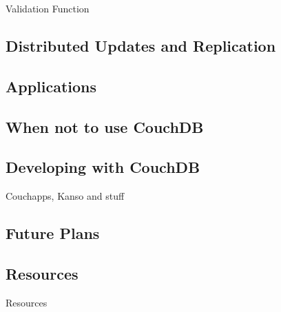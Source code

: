 \documentclass{beamer}
\begin{document}
\begin{frame}{Validation Function}
\end{frame}

\subsection{Distributed Updates and Replication}
\begin{frame}
\end{frame}

\subsection{Applications}
\begin{frame}
\end{frame}

\subsection{When not to use CouchDB}
\begin{frame}
\end{frame}

\subsection{Developing with CouchDB}
\begin{frame}{Couchapps, Kanso and stuff}
\end{frame}

\subsection{Future Plans}
\begin{frame}
\end{frame}

\subsection{Resources}
\begin{frame}{Resources}
\end{frame}
\end{document}
